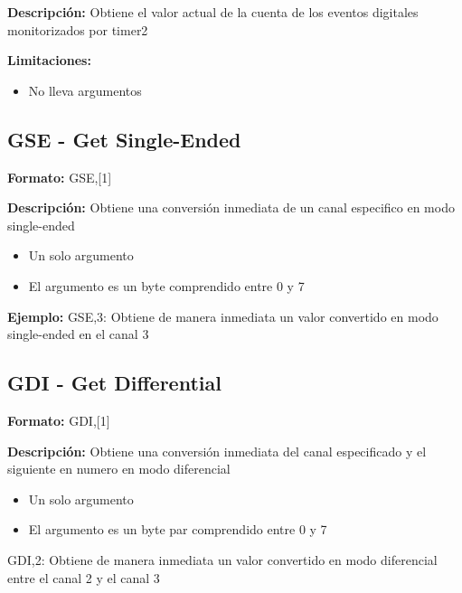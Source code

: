\textbf{Descripci\'on:}
Obtiene el valor actual de la cuenta de los eventos digitales monitorizados por timer2

\textbf{Limitaciones:}
\begin{itemize}
  \item No lleva argumentos
\end{itemize}


\subsection{GSE - Get Single-Ended} %
\label{sub:gse_get_single_ended}
\textbf{Formato:} GSE,[1]

\textbf{Descripci\'on:}
Obtiene una conversi\'on inmediata de un canal especifico en modo single-ended

\begin{itemize}
  \item Un solo argumento
  \item El argumento es un byte comprendido entre 0 y 7
\end{itemize}

\textbf{Ejemplo:}
GSE,3: Obtiene de manera inmediata un valor convertido en modo single-ended en el canal 3


\subsection{GDI - Get Differential} %
\label{sub:gdi_get_differential}
\textbf{Formato:} GDI,[1]

\textbf{Descripci\'on:}
Obtiene una conversi\'on inmediata del canal especificado y el siguiente en numero en modo diferencial

\begin{itemize}
  \item Un solo argumento
  \item El argumento es un byte par comprendido entre 0 y 7
\end{itemize}

GDI,2: Obtiene de manera inmediata un valor convertido en modo diferencial entre el canal 2 y el canal 3 

